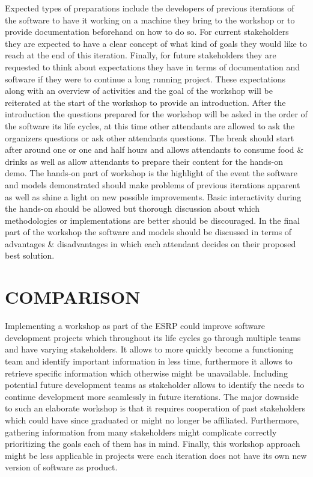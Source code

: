 \documentclass[conference]{IEEEtran}
\begin{document}
Expected types of preparations include the developers of previous iterations of the software to have it working on a machine they bring to the workshop or to provide documentation beforehand on how to do so. For current stakeholders they are expected to have a clear concept of what kind of goals they would like to reach at the end of this iteration. Finally, for future stakeholders they are requested to think about expectations they have in terms of documentation and software if they were to continue a long running project. These expectations along with an overview of activities and the goal of the workshop will be reiterated at the start of the workshop to provide an introduction.
After the introduction the questions prepared for the workshop will be asked in the order of the software its life cycles, at this time other attendants are allowed to ask the organizers questions or ask other attendants questions. The break should start after around one or one and half hours and allows attendants to consume food \& drinks as well as allow attendants to prepare their content for the hands-on demo. The hands-on part of workshop is the highlight of the event the software and models demonstrated should make problems of previous iterations apparent as well as shine a light on new possible improvements. Basic interactivity during the hands-on should be allowed but thorough discussion about which methodologies or implementations are better should be discouraged. In the final part of the workshop the software and models should be discussed in terms of advantages \& disadvantages in which each attendant decides on their proposed best solution.

\section{COMPARISON}
Implementing a workshop as part of the ESRP could improve software development projects which throughout its life cycles go through multiple teams and have varying stakeholders. It allows to more quickly become a functioning team and identify important information in less time, furthermore it allows to retrieve specific information which otherwise might be unavailable. Including potential future development teams as stakeholder allows to identify the needs to continue development more seamlessly in future iterations. The major downside to such an elaborate workshop is that it requires cooperation of past stakeholders which could have since graduated or might no longer be affiliated. Furthermore, gathering information from many stakeholders might complicate correctly prioritizing the goals each of them has in mind. Finally, this workshop approach might be less applicable in projects were each iteration does not have its own new version of software as product.
\end{document}
